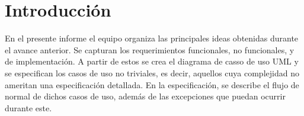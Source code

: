\section{Introducción}

En el presente informe el equipo organiza las principales ideas obtenidas durante el avance anterior. Se capturan los requerimientos funcionales, no funcionales, y de implementación. A partir de estos se crea el diagrama de casso de uso UML y se especifican los casos de uso no triviales, es decir, aquellos cuya complejidad no ameritan una especificación detallada. En la especificación, se describe el flujo de normal de dichos casos de uso, además de las excepciones que puedan ocurrir durante este.
